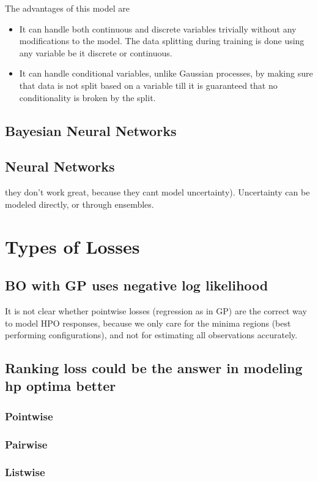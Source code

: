 \documentclass[12pt, twoside, ngerman]{report}
\begin{document}
   The advantages of this model are
   \begin{itemize}
   \item It can handle both continuous and discrete variables trivially without any modifications to the model.
The data splitting during training is done using any variable be it discrete or continuous.
	\item It can handle conditional variables, unlike Gaussian processes, by making sure that data is not split based on a variable till it is guaranteed that no conditionality is broken by the split.
   \end{itemize}

\subsection{Bayesian Neural Networks}
\subsection{Neural Networks}
they don't work great, because they cant model uncertainty). Uncertainty can be modeled directly, or through ensembles.

\section{Types of Losses}
\subsection{BO with GP uses negative log likelihood}
It is not clear whether pointwise losses (regression as in GP) are the correct way to model HPO responses, because we only care for the minima regions (best performing configurations), and not for estimating all observations accurately.

\subsection{Ranking loss could be the answer in modeling hp optima better}
\subsubsection{Pointwise}
\subsubsection{Pairwise}
\subsubsection{Listwise}
\end{document}
